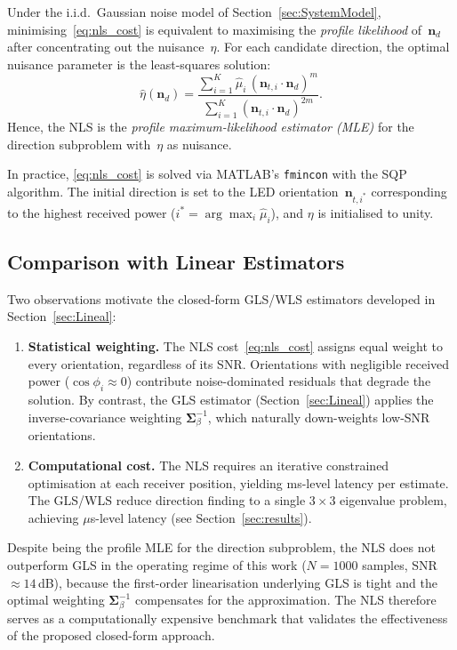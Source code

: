\documentclass[journal]{IEEEtran}
\begin{document}
Under the i.i.d.\ Gaussian noise model of Section~\ref{sec:SystemModel}, 
minimising~\eqref{eq:nls_cost} is equivalent to maximising the 
\emph{profile likelihood} of~$\mathbf{n}_d$ after concentrating out 
the nuisance~$\eta$.  For each candidate direction, the optimal nuisance 
parameter is the least-squares solution:
\begin{equation}
  \hat\eta(\mathbf{n}_d)
  = \frac{\displaystyle\sum_{i=1}^{K}\hat\mu_i\,
    (\mathbf{n}_{t,i}\cdot\mathbf{n}_d)^{m}}
   {\displaystyle\sum_{i=1}^{K}
    (\mathbf{n}_{t,i}\cdot\mathbf{n}_d)^{2m}}.
  \label{eq:eta_hat}
\end{equation}
Hence, the NLS is the \emph{profile maximum-likelihood estimator (MLE)} 
for the direction subproblem with~$\eta$ as nuisance.

In practice, \eqref{eq:nls_cost} is solved via MATLAB's \texttt{fmincon} 
with the SQP algorithm.  The initial direction is set to the LED 
orientation~$\mathbf{n}_{t,i^*}$ corresponding to the highest received 
power ($i^* = \arg\max_i \hat\mu_i$), and $\eta$ is initialised to unity.

\subsection{Comparison with Linear Estimators}

Two observations motivate the closed-form GLS/WLS estimators developed 
in Section~\ref{sec:Lineal}:
\begin{enumerate}[leftmargin=*]
\item \textbf{Statistical weighting.}  
  The NLS cost~\eqref{eq:nls_cost} assigns equal weight to every 
  orientation, regardless of its SNR.  Orientations with negligible 
  received power ($\cos\phi_i\approx0$) contribute noise-dominated 
  residuals that degrade the solution.  By contrast, the GLS 
  estimator (Section~\ref{sec:Lineal}) applies the inverse-covariance 
  weighting $\mathbf{\Sigma}_\beta^{-1}$, which naturally down-weights 
  low-SNR orientations.

\item \textbf{Computational cost.}  
  The NLS requires an iterative constrained optimisation at each receiver 
  position, yielding ms-level latency per estimate.  The GLS/WLS 
  reduce direction finding to a single $3\times3$ eigenvalue problem, 
  achieving $\mu$s-level latency (see Section~\ref{sec:results}).
\end{enumerate}

\noindent
Despite being the profile MLE for the direction subproblem, the NLS 
does not outperform GLS in the operating regime of this work ($N=1000$ 
samples, SNR$\approx14\,$dB), because the first-order linearisation 
underlying GLS is tight and the optimal weighting 
$\mathbf{\Sigma}_\beta^{-1}$ compensates for the approximation.
The NLS therefore serves as a computationally expensive benchmark 
that validates the effectiveness of the proposed closed-form approach.
\end{document}
